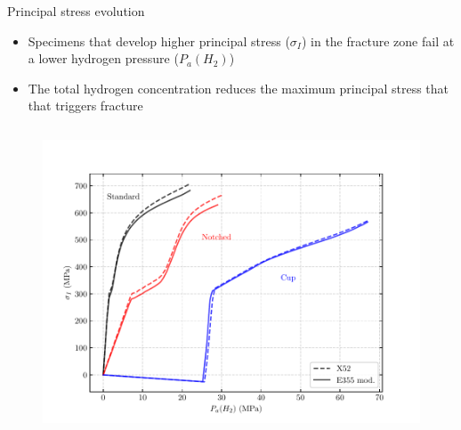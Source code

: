 \documentclass[9pt]{beamer}
\begin{document}

\begin{frame}{Principal stress evolution}

\begin{itemize}
	\item Specimens that develop higher principal stress ($\sigma_I$) in the fracture zone fail at a lower hydrogen pressure ($P_a(H_2)$)
	\vspace{0.25cm}
	\item The total hydrogen concentration reduces the maximum principal stress that that triggers fracture
\end{itemize}

\begin{columns}

\begin{column}{0.49\textwidth}
	\begin{figure}
		\centering
		\includegraphics[width=\textwidth]{Images/sigp1_pressure.pdf} \\
	\end{figure}
\end{column}


\end{columns}
\end{frame}
\end{document}
